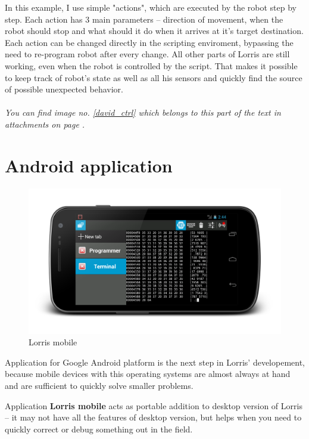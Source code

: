 \documentclass[12pt, a4paper, oneside]{article}
\newcommand{\It}{\textit}  %
\begin{document}
In this example, I use simple "actions", which are executed by the robot step by step. Each action has 3 main parameters -- direction of movement, when the robot should stop and what should it do when it arrives at it's target destination. Each action can be changed directly in the scripting enviroment, bypassing the need to re-program robot after every change. All other parts of Lorris are still working, even when the robot is controlled by the script. That makes it possible to keep track of robot's state as well as all his sensors and quickly find the source of possible unexpected behavior.
\\
\\
\noindent\It{You can find image no. \ref{david_ctrl} which belongs to this part of the text in attachments on page \pageref{david_ctrl}.}

\newpage
\section{Android application}
\begin{figure}[H]
\begin{center}
\includegraphics[width=\textwidth]{img/mobile.png}
\caption{Lorris mobile}
\end{center}
\end{figure}

Application for Google Android\cite{android} platform is the next step in Lorris' developement, because mobile devices with this operating systems are almost always at hand and are sufficient to quickly solve smaller problems.

Application {\bf Lorris mobile} acts as portable addition to desktop version of Lorris -- it may not have all the features of desktop version, but helps when you need to quickly correct or debug something out in the field.
\end{document}
